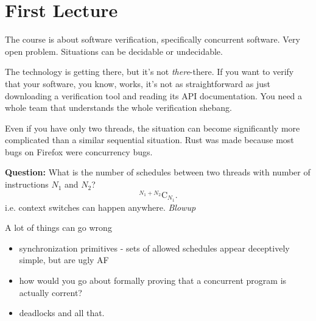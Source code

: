 \documentclass[a4paper]{article}
\begin{document}
\section{First Lecture}
The course is about software verification, specifically concurrent software.
Very open problem. Situations can be decidable or undecidable. 

The technology is getting there, but it's not \emph{there}-there.
If you want to verify that your software, you know, works, it's not
as straightforward as just downloading a verification tool and reading
its API documentation. You need a whole team that understands the
whole verification shebang.

Even if you have only two threads, the situation can become significantly
more complicated than a similar sequential situation. Rust was made
because most bugs on Firefox were concurrency bugs.

\textbf{Question:} What is the number of schedules between two threads
with number of instructions $N_1$ and $N_2$? 
\[
	^{N_1+N_2}\text{C}_{N_1}
.\] 
i.e. context switches can happen anywhere. \emph{Blowup}

A lot of things can go wrong
\begin{itemize}
	\item synchronization primitives - sets of allowed schedules
		appear deceptively simple, but are ugly AF
	\item how would you go about formally proving that a concurrent
		program is actually corrent?
	\item deadlocks and all that.
\end{itemize}
\end{document}
